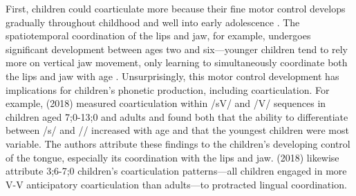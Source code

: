 \documentclass[a4paper,man,natbib,donotrepeattitle, apacite]{apa6}
\begin{document}
First, children could coarticulate more because their fine motor control develops gradually throughout childhood and well into early adolescence \cite{barbierWhatAnticipatoryCoarticulation2020,kentAnatomicalNeuromuscularMaturation1976,perkellFiveDecadesResearch2013,walshArticulatoryMovementsAdolescents2002}. The spatiotemporal coordination of the lips and jaw, for example, undergoes significant development between ages two and six---younger children tend to rely more on vertical jaw movement, only learning to simultaneously coordinate both the lips and jaw with age \cite{greenPhysiologicDevelopmentSpeech2000}. Unsurprisingly, this motor control development has implications for children’s phonetic production, including coarticulation. For example, \citeauthor{zharkovaDynamicsVoicelessSibilant2018} (2018) measured coarticulation within /\textschwa sV/ and /\textschwa \textesh V/ sequences in children aged 7;0-13;0 and adults and found both that the ability to differentiate between /s/ and /\textesh/ increased with age and that the youngest children were most variable. The authors attribute these findings to the children’s developing control of the tongue, especially its coordination with the lips and jaw. \citeauthor{rubertusDevelopmentGesturalOrganization2018}(2018) likewise attribute 3;6-7;0 children’s coarticulation patterns---all children engaged in more V-V anticipatory coarticulation than adults---to protracted lingual coordination.           
\end{document}
